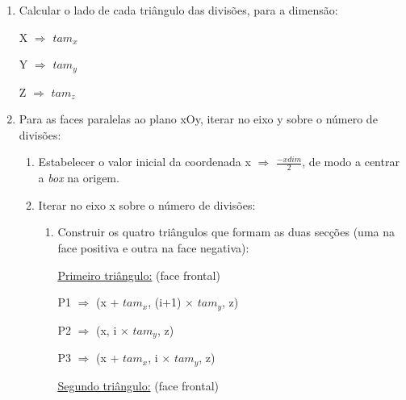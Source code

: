 \documentclass[a4paper]{article}
\begin{document}
\ttfamily
\begin{enumerate}
  \item Calcular o lado de cada triângulo das divisões, para a dimensão:

  \vspace{0.2cm}

  \hspace{5.0cm}X $\Rightarrow$ \underline{$tam_{x}$}

  \hspace{5.0cm}Y $\Rightarrow$ \underline{$tam_{y}$}

  \hspace{5.0cm}Z $\Rightarrow$ \underline{$tam_{z}$}

  \item Para as faces paralelas ao plano xOy, iterar no eixo y sobre o número de divisões:
  \begin{enumerate}
    \item Estabelecer o valor inicial da coordenada x $\Rightarrow$ $\frac{-xdim}{2}$, de modo a centrar a \textit{box} na origem.
    \item Iterar no eixo x sobre o número de divisões:
    \begin{enumerate}
    \item Construir os quatro triângulos que formam as duas secções (uma na face positiva e outra na face negativa):

      \vspace{0.5cm}

      \underline{Primeiro triângulo:} (face frontal)

      \vspace{0.5cm}

          \hspace{0.5cm} P1 $\Rightarrow$ (x + $tam_{x}$, (i+1) $\times$ $tam_{y}$, z)

      \vspace{0.2cm}

          \hspace{0.5cm} P2 $\Rightarrow$ (x, i $\times$ $tam_{y}$, z)

      \vspace{0.2cm}

          \hspace{0.5cm} P3 $\Rightarrow$ (x + $tam_{x}$, i $\times$ $tam_{y}$, z)

      \vspace{0.5cm}

      \underline{Segundo triângulo:} (face frontal)


\end{enumerate}
\end{enumerate}
\end{enumerate}
\end{document}
